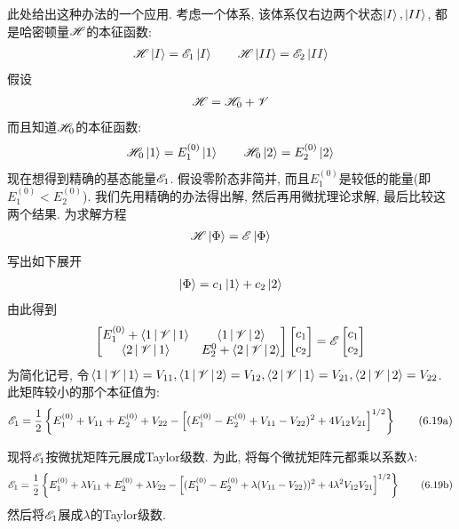 此处给出这种办法的一个应用. 
考虑一个体系, 
该体系仅右边两个状态$\Ket{I},\Ket{II}$, 
都是哈密顿量$\mathscr{H}$的本征函数:
\begin{align*}
\mathscr{H}\Ket{I} = \mathscr{E}_1\Ket{I} \qquad \mathscr{H}\Ket{II} = \mathscr{E}_2\Ket{II}
\end{align*}
假设
\begin{align*}
\mathscr{H}=\mathscr{H}_0+\mathscr{V}
\end{align*}
而且知道$\mathscr{H}_0$的本征函数:
\begin{align*}
\mathscr{H}_0\Ket{1} = E_1^{(0)}\Ket{1}\qquad \mathscr{H}_0\Ket{2} = E_2^{(0)}\Ket{2}
\end{align*}
现在想得到精确的基态能量$\mathscr{E}_1$. 
假设零阶态非简并, 
而且$E_1^{(0)}$是较低的能量(即$E_1^{(0)} < E_2^{(0)}$). 
我们先用精确的办法得出解, 
然后再用微扰理论求解, 
最后比较这两个结果. 
为求解方程
\begin{align}
\mathscr{H}\Ket{\Phi}=\mathscr{E}\Ket{\Phi}
\end{align}
写出如下展开
\begin{align}
\Ket{\Phi} = c_1\Ket{1} + c_2\Ket{2}
\end{align}
由此得到
\begin{align}
\begin{bmatrix}
E_1^{(0)} + \Braket{1|\mathscr{V}|1} & \Braket{1|\mathscr{V}|2}\\
\Braket{2|\mathscr{V}|1}			& E_2^{0} + \Braket{2|\mathscr{V}|2}
\end{bmatrix}
\begin{bmatrix}
c_1\\c_2
\end{bmatrix}
=
\mathscr{E}\begin{bmatrix}
c_1\\c_2
\end{bmatrix}
\end{align}
为简化记号, 
令$\Braket{1|\mathscr{V}|1}=V_{11},\Braket{1|\mathscr{V}|2}=V_{12},\Braket{2|\mathscr{V}|1}=V_{21},\Braket{2|\mathscr{V}|2}=V_{22}$. 
此矩阵较小的那个本征值为:
\begin{align}
\es_1 = \frac{1}{2} \left\{  E_1^{(0)} + V_{11} + E_2^{(0)} + V_{22} - \left[ (E_1^{(0)} -E_{2}^{(0)} + V_{11} - V_{22})^2 +4V_{12}V_{21} \right]^{1/2}      \right\}\tag{6.19a}
\addtocounter{equation}{1}
\end{align}

现将$\mathscr{E}_1$按微扰矩阵元展成Taylor级数. 
 为此, 
将每个微扰矩阵元都乘以系数$\lambda$:
\begin{align}
\mathscr{E}_1 = \frac{1}{2} \left\{  E_1^{(0)} + \lambda V_{11} + E_2^{(0)} + \lambda V_{22} - \left[ (E_1^{(0)} -E_{2}^{(0)} + \lambda(V_{11} - V_{22}))^2 +4\lambda^2 V_{12}V_{21} \right]^{1/2}      \right\}\tag{6.19b}
\end{align}
然后将$\mathscr{E}_1$展成$\lambda$的Taylor级数.


